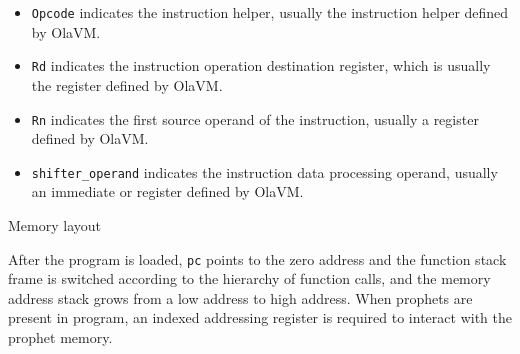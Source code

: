 \begin{itemize}
    \item \texttt{Opcode} indicates the instruction helper, usually the instruction helper defined by OlaVM.\par
    \item \texttt{Rd} indicates the instruction operation destination register, which is usually the register defined by OlaVM.\par
    \item \texttt{Rn} indicates the first source operand of the instruction, usually a register defined by OlaVM.\par
    \item \texttt{shifter\_operand} indicates the instruction data processing operand, usually an immediate or register defined by OlaVM.
\end{itemize}

Memory layout\par
After the program is loaded, \texttt{pc} points to the zero address and the function stack frame is switched according to the hierarchy of function calls,
and the memory address stack grows from a low address to high address.
When prophets are present in program, an indexed addressing register is required to interact with the prophet memory.